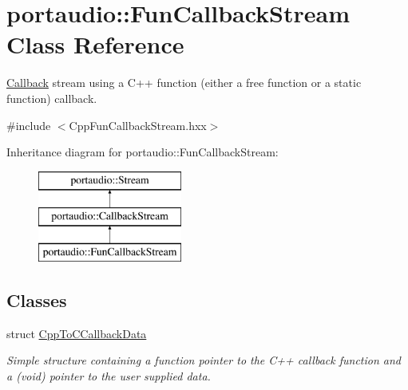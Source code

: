 \hypertarget{classportaudio_1_1_fun_callback_stream}{}\section{portaudio\+:\+:Fun\+Callback\+Stream Class Reference}
\label{classportaudio_1_1_fun_callback_stream}


\hyperlink{class_callback}{Callback} stream using a C++ function (either a free function or a static function) callback.  




{\ttfamily \#include $<$Cpp\+Fun\+Callback\+Stream.\+hxx$>$}

Inheritance diagram for portaudio\+:\+:Fun\+Callback\+Stream\+:\begin{figure}[H]
\begin{center}
\leavevmode
\includegraphics[height=3.000000cm]{classportaudio_1_1_fun_callback_stream}
\end{center}
\end{figure}
\subsection*{Classes}
\begin{DoxyCompactItemize}
\item 
struct \hyperlink{structportaudio_1_1_fun_callback_stream_1_1_cpp_to_c_callback_data}{Cpp\+To\+C\+Callback\+Data}
\begin{DoxyCompactList}\small\item\em Simple structure containing a function pointer to the C++ callback function and a (void) pointer to the user supplied data. \end{DoxyCompactList}\end{DoxyCompactItemize}
